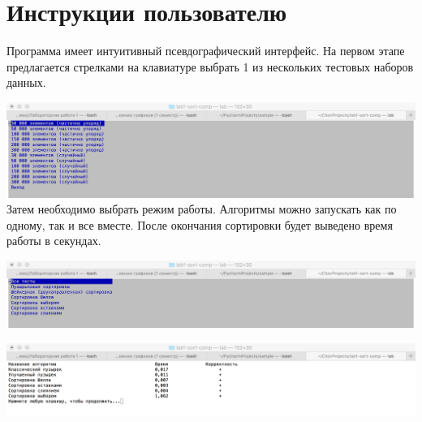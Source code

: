 \section{Инструкции пользователю}
Программа имеет интуитивный псевдографический интерфейс. На первом этапе
предлагается стрелками на клавиатуре выбрать 1 из нескольких тестовых наборов данных.\par
\includegraphics[width=\textwidth]{screenshot1.png}
Затем необходимо выбрать режим работы. Алгоритмы можно запускать как по одному,
так и все вместе. После окончания сортировки будет выведено время работы в секундах.\par
\includegraphics[width=\textwidth]{screenshot2.png}\par
\includegraphics[width=\textwidth]{screenshot3.png}\par